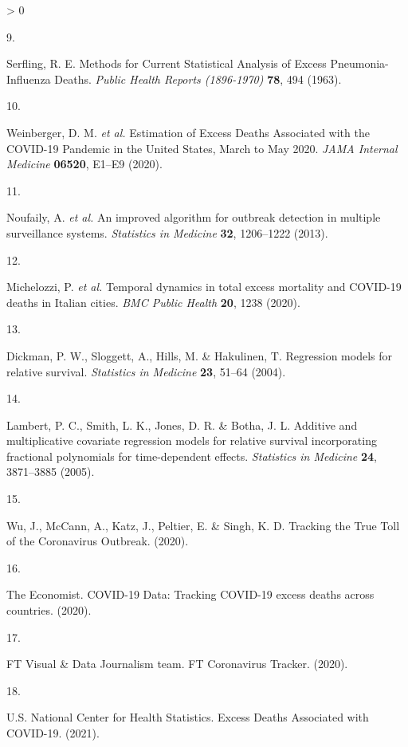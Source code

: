 \documentclass[
]{article}
\newlength{\cslhangindent}
\newlength{\csllabelwidth}
\newenvironment{CSLReferences}[2] %
 {%
  \setlength{\parindent}{0pt}
  \ifodd #1 \everypar{\setlength{\hangindent}{\cslhangindent}}\ignorespaces\fi
  \ifnum #2 > 0
  \setlength{\parskip}{#2\baselineskip}
  \fi
 }%
 {}
\newcommand{\CSLLeftMargin}[1]{\parbox[t]{\csllabelwidth}{#1}}
\newcommand{\CSLRightInline}[1]{\parbox[t]{\linewidth - \csllabelwidth}{#1}\break}
\begin{document}
\begin{CSLReferences}{0}{0}
\leavevmode\hypertarget{ref-Serfling1963}{}%
\CSLLeftMargin{9. }
\CSLRightInline{Serfling, R. E. {Methods for Current Statistical Analysis of Excess Pneumonia-Influenza Deaths}. \emph{Public Health Reports (1896-1970)} \textbf{78}, 494 (1963).}

\leavevmode\hypertarget{ref-Weinberger2020a}{}%
\CSLLeftMargin{10. }
\CSLRightInline{Weinberger, D. M. \emph{et al.} {Estimation of Excess Deaths Associated with the COVID-19 Pandemic in the United States, March to May 2020}. \emph{JAMA Internal Medicine} \textbf{06520}, E1--E9 (2020).}

\leavevmode\hypertarget{ref-Noufaily2013}{}%
\CSLLeftMargin{11. }
\CSLRightInline{Noufaily, A. \emph{et al.} {An improved algorithm for outbreak detection in multiple surveillance systems}. \emph{Statistics in Medicine} \textbf{32}, 1206--1222 (2013).}

\leavevmode\hypertarget{ref-Michelozzi2020}{}%
\CSLLeftMargin{12. }
\CSLRightInline{Michelozzi, P. \emph{et al.} {Temporal dynamics in total excess mortality and COVID-19 deaths in Italian cities}. \emph{BMC Public Health} \textbf{20}, 1238 (2020).}

\leavevmode\hypertarget{ref-Dickman2004}{}%
\CSLLeftMargin{13. }
\CSLRightInline{Dickman, P. W., Sloggett, A., Hills, M. \& Hakulinen, T. {Regression models for relative survival}. \emph{Statistics in Medicine} \textbf{23}, 51--64 (2004).}

\leavevmode\hypertarget{ref-Lambert2005}{}%
\CSLLeftMargin{14. }
\CSLRightInline{Lambert, P. C., Smith, L. K., Jones, D. R. \& Botha, J. L. {Additive and multiplicative covariate regression models for relative survival incorporating fractional polynomials for time-dependent effects}. \emph{Statistics in Medicine} \textbf{24}, 3871--3885 (2005).}

\leavevmode\hypertarget{ref-Wu2020}{}%
\CSLLeftMargin{15. }
\CSLRightInline{Wu, J., McCann, A., Katz, J., Peltier, E. \& Singh, K. D. {Tracking the True Toll of the Coronavirus Outbreak}. (2020).}

\leavevmode\hypertarget{ref-TheEconomist2020}{}%
\CSLLeftMargin{16. }
\CSLRightInline{The Economist. {COVID-19 Data: Tracking COVID-19 excess deaths across countries}. (2020).}

\leavevmode\hypertarget{ref-FTVisualux5cux26DataJournalismteam2020}{}%
\CSLLeftMargin{17. }
\CSLRightInline{FT Visual \& Data Journalism team. {FT Coronavirus Tracker}. (2020).}

\leavevmode\hypertarget{ref-U.S.NationalCenterforHealthStatistics2021}{}%
\CSLLeftMargin{18. }
\CSLRightInline{U.S. National Center for Health Statistics. {Excess Deaths Associated with COVID-19}. (2021).}


\end{CSLReferences}
\end{document}
